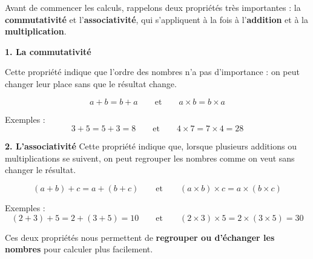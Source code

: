 \documentclass[answers]{exam}
\begin{document}
\begin{solution}

  Avant de commencer les calculs, rappelons deux propriétés très importantes :  
la \textbf{commutativité} et l’\textbf{associativité}, qui s’appliquent à la fois à l’\textbf{addition} et à la \textbf{multiplication}.

\bigskip
\textbf{1. La commutativité}

\vspace{1em}
Cette propriété indique que l’ordre des nombres n’a pas d’importance :  
on peut changer leur place sans que le résultat change.

\[
a + b = b + a \qquad \text{et} \qquad a \times b = b \times a
\]

Exemples :
\[
3 + 5 = 5 + 3 = 8 \qquad \text{et} \qquad 4 \times 7 = 7 \times 4 = 28
\]

\bigskip
\textbf{2. L’associativité}
\vspace{1em}
Cette propriété indique que, lorsque plusieurs additions ou multiplications se suivent,  
on peut regrouper les nombres comme on veut sans changer le résultat.

\[
(a + b) + c = a + (b + c) \qquad \text{et} \qquad (a \times b) \times c = a \times (b \times c)
\]

Exemples :
\[
(2 + 3) + 5 = 2 + (3 + 5) = 10 \qquad \text{et} \qquad (2 \times 3) \times 5 = 2 \times (3 \times 5) = 30
\]

\bigskip
Ces deux propriétés nous permettent de \textbf{regrouper ou d’échanger les nombres} pour calculer plus facilement.

\bigskip


\end{solution}
\end{document}
